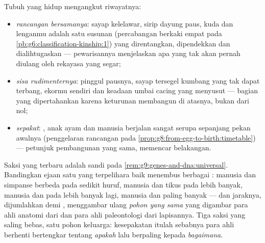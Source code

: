 \begin{proposition}\label{prop:g9:evidence-of-evolution:anatomy}
Tubuh yang hidup mengangkut riwayatnya:
\begin{itemize}
  \item \emph{rancangan bersamanya}: sayap kelelawar, sirip
        dayung paus,  kuda dan lenganmu adalah satu
        susunan  (percabangan berkaki empat pada
        \cref{pb:g6:classification-kinship:1}) yang
        direntangkan, dipendekkan dan dialihtugaskan ---
        pewarisannya menjelaskan apa yang tak akan pernah
        diulang oleh rekayasa yang segar;
  \item \emph{sisa rudimenternya}: pinggul pausnya, sayap
        tersegel kumbang yang tak dapat terbang, 
        ekormu sendiri dan keadaan umbai cacing yang
        menyusut --- bagian yang dipertahankan karena
        keturunan membangun di atasnya, bukan dari nol;
  \item \emph{ sepakat}:   ,
        anak ayam dan manusia berjalan sangat serupa
        sepanjang pekan awalnya (penggelaran rancangan pada
        \cref{prop:g8:from-egg-to-birth:timetable}) ---
        petunjuk pembangunan yang sama, memencar belakangan.
\end{itemize}
\end{proposition}
\admitted

\begin{proposition}\label{prop:g9:evidence-of-evolution:molecules}
Saksi yang terbaru adalah sandi pada
\cref{rem:g9:genes-and-dna:universal}. Bandingkan ejaan satu
 yang terpelihara baik menembus berbagai : manusia
dan simpanse berbeda pada sedikit huruf, manusia dan tikus
pada lebih banyak, manusia dan  pada lebih banyak lagi,
manusia dan  paling banyak --- dan jaraknya, dijumlahkan
 demi , menggambar ulang \emph{pohon yang sama} yang
digambar para ahli anatomi dari  dan para ahli
paleontologi dari lapisannya. Tiga saksi yang saling bebas,
satu pohon keluarga: kesepakatan itulah sebabnya para ahli
 berhenti bertengkar tentang \emph{apakah} lalu
berpaling kepada \emph{bagaimana}.
\end{proposition}
\admitted

